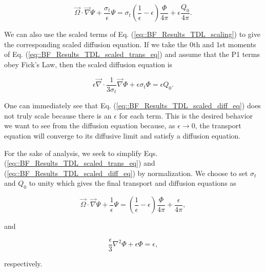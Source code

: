 \begin{equation}
\label{eq::BF_Results_TDL_scaled_trans_eq}
\vec{\Omega} \cdot \vec{\nabla} \Psi + \frac{\sigma_t}{\epsilon} \Psi = \sigma_t \left( \frac{1}{\epsilon} - \epsilon   \right)  \frac{\Phi}{4 \pi} + \epsilon \frac{Q_0}{4 \pi} .
\end{equation}

\noindent We can also use the scaled terms of Eq. (\ref{eq::BF_Results_TDL_scaling}) to give the corresponding scaled diffusion equation. If we take the 0th and 1st moments of Eq. (\ref{eq::BF_Results_TDL_scaled_trans_eq}) and assume that the P1 terms obey Fick's Law, then the scaled diffusion equation is

\begin{equation}
\label{eq::BF_Results_TDL_scaled_diff_eq}
\epsilon \vec{\nabla} \cdot \frac{1}{3 \sigma_t}  \vec{\nabla} \Phi + \epsilon \sigma_t \Phi =  \epsilon Q_0.
\end{equation}

\noindent One can immediately see that Eq. (\ref{eq::BF_Results_TDL_scaled_diff_eq}) does not truly scale because there is an $\epsilon$ for each term. This is the desired behavior we want to see from the diffusion equation because, as $\epsilon \rightarrow 0$, the transport equation will converge to its diffusive limit and satisfy a diffusion equation.

For the sake of analysis, we seek to simplify Eqs. (\ref{eq::BF_Results_TDL_scaled_trans_eq}) and (\ref{eq::BF_Results_TDL_scaled_diff_eq}) by normalization. We choose to set $\sigma_t$ and $Q_0$ to unity which gives the final transport and diffusion equations as  

\begin{equation}
\label{eq::BF_Results_TDL_normalized_trans_eq}
\vec{\Omega} \cdot \vec{\nabla} \Psi + \frac{1}{\epsilon} \Psi =  \left( \frac{1}{\epsilon} - \epsilon   \right)  \frac{\Phi}{4 \pi} +  \frac{\epsilon}{4 \pi} ,
\end{equation}

\noindent and

\begin{equation}
\label{eq::BF_Results_TDL_normalized_diff_eq}
\frac{\epsilon}{3} {\nabla}^2 \Phi + \epsilon  \Phi =  \epsilon ,
\end{equation}

\noindent respectively.

